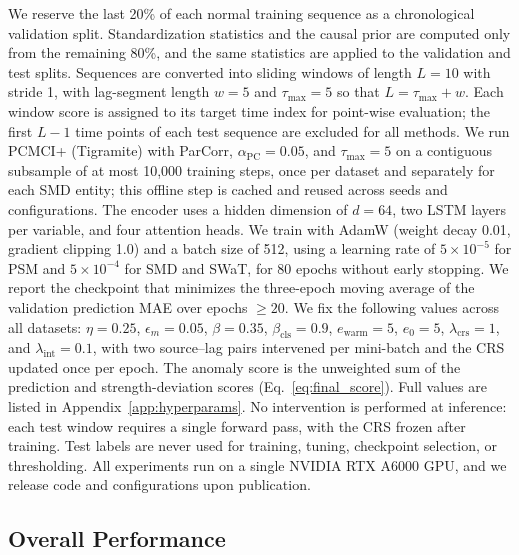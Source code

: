 We reserve the last 20\% of each normal training sequence as a chronological
validation split. Standardization statistics and the causal prior are computed
only from the remaining 80\%, and the same statistics are applied to the
validation and test splits. Sequences are converted into sliding windows of
length \(L=10\) with stride 1, with lag-segment length \(w=5\) and
\(\tau_{\max}=5\) so that \(L=\tau_{\max}+w\). Each window score is assigned to
its target time index for point-wise evaluation; the first \(L-1\) time points
of each test sequence are excluded for all methods. We run PCMCI+ (Tigramite)
with ParCorr, \(\alpha_{\mathrm{PC}}=0.05\), and \(\tau_{\max}=5\) on a
contiguous subsample of at most 10{,}000 training steps, once per dataset and
separately for each SMD entity; this offline step is cached and reused across
seeds and configurations.
The encoder uses a hidden dimension of \(d=64\), two LSTM layers per variable,
and four attention heads. We train with AdamW (weight decay 0.01, gradient
clipping 1.0) and a batch size of 512, using a learning rate of
\(5\times10^{-5}\) for PSM and \(5\times10^{-4}\) for SMD and SWaT, for 80 epochs
without early stopping. We report the checkpoint that minimizes the three-epoch
moving average of the validation prediction MAE over epochs \(\ge 20\).
We fix the following values across all datasets: \(\eta=0.25\),
\(\epsilon_m=0.05\), \(\beta=0.35\), \(\beta_{\mathrm{cls}}=0.9\),
\(e_{\mathrm{warm}}=5\), \(e_0=5\), \(\lambda_{\mathrm{crs}}=1\), and
\(\lambda_{\mathrm{int}}=0.1\), with two source--lag pairs intervened per
mini-batch and the CRS updated once per epoch.
The anomaly score is the unweighted sum of the prediction and
strength-deviation scores (Eq.~\eqref{eq:final_score}).
Full values are listed in Appendix~\ref{app:hyperparams}. No intervention is
performed at inference: each test window requires a single forward pass, with
the CRS frozen after training. Test labels are never used for training,
tuning, checkpoint selection, or thresholding. All experiments run on a single
NVIDIA RTX A6000 GPU, and we release code and configurations upon publication.

\subsection{Overall Performance}
\label{sec:overall_performance}

